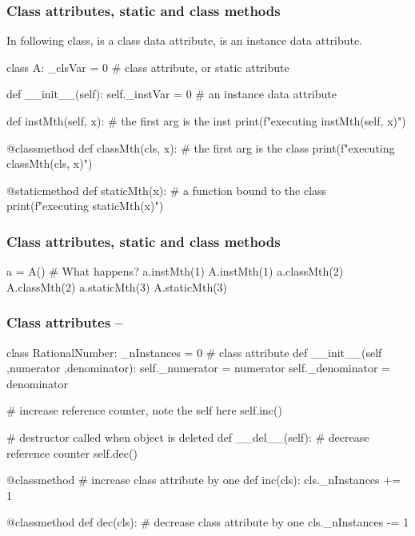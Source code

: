 \documentclass[hyperref={pdfpagelabels=false},table]{beamer}
\begin{document}
\begin{frame}[fragile]\frametitle{Class attributes, static and class methods}

  In following class,  is a class data attribute, 
   is an instance data attribute.

\begin{python}
class A:
  _clsVar = 0 # class attribute, or static attribute
  
  def __init__(self):
    self._instVar = 0 # an instance data attribute

  def instMth(self, x): # the first arg is the inst
    print(f"executing instMth({self}, {x})")
        
  @classmethod
  def classMth(cls, x): # the first arg is the class
    print(f"executing classMth({cls}, {x})")

  @staticmethod
  def staticMth(x): # a function bound to the class
    print(f"executing staticMth({x})")
\end{python}  

\end{frame}

\begin{frame}[fragile]\frametitle{Class attributes, static and class methods}

\begin{python}
a = A()
# What happens?
a.instMth(1)
A.instMth(1)
a.classMth(2)
A.classMth(2)
a.staticMth(3)
A.staticMth(3)
\end{python}

\end{frame}

\begin{frame}[fragile]\frametitle{Class attributes -- }

\begin{python}
class RationalNumber:
  _nInstances = 0 # class attribute
  def __init__(self ,numerator ,denominator):
    self._numerator   = numerator
    self._denominator = denominator

    # increase reference counter, note the self here
    self.inc()

  # destructor called when object is deleted
  def __del__(self):
    # decrease reference counter
    self.dec()

  @classmethod # increase class attribute by one
  def inc(cls):
    cls._nInstances += 1

  @classmethod
  def dec(cls): # decrease class attribute by one
    cls._nInstances -= 1
\end{python}

\end{frame}
\end{document}
